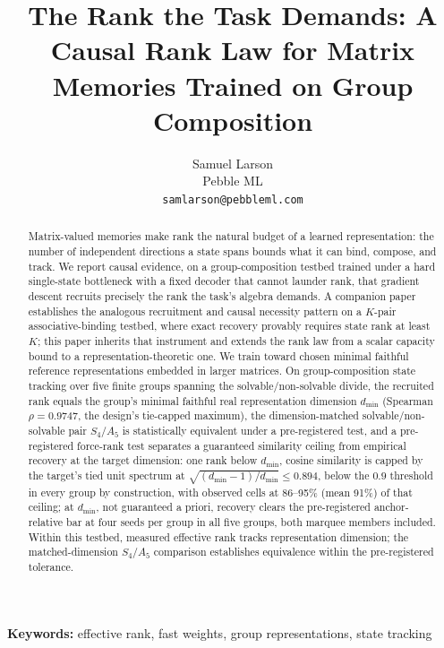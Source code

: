 \documentclass{article}
\title{The Rank the Task Demands:
A Causal Rank Law for Matrix Memories Trained on Group Composition}
\author{%
  Samuel Larson\\
  Pebble ML\\
  \texttt{samlarson@pebbleml.com}%
}
\theoremstyle{plain}
\newcommand{\dmin}{d_{\min}}
\begin{document}
\maketitle

\begin{abstract}
Matrix-valued memories make rank the natural budget of a learned
representation: the number of independent directions a state spans bounds
what it can bind, compose, and track. We report causal evidence, on a
group-composition testbed trained under a hard single-state bottleneck
with a fixed decoder that cannot launder rank, that gradient descent
recruits precisely the rank the task's algebra demands. A companion
paper \citep{larson2026companion} establishes the analogous recruitment
and causal necessity pattern on a $K$-pair associative-binding testbed,
where exact recovery provably requires state rank at least $K$; this
paper inherits that instrument and extends the rank law from a scalar
capacity bound to a representation-theoretic one.
We train toward chosen minimal faithful reference representations
embedded in larger matrices.
On
group-composition state tracking over five finite groups spanning the
solvable/non-solvable divide, the recruited rank equals the group's minimal
faithful real representation dimension $\dmin$ (Spearman $\rho = 0.9747$,
the design's tie-capped maximum),
the dimension-matched solvable/non-solvable
pair $S_4$/$A_5$ is statistically equivalent under a pre-registered
test,
and a pre-registered force-rank test separates a guaranteed similarity
ceiling from empirical recovery at the target dimension: one rank below
$\dmin$, cosine similarity is capped by the target's
tied unit spectrum at $\sqrt{(\dmin{-}1)/\dmin} \le 0.894$, below the
$0.9$ threshold in every group by construction, with observed cells
at 86--95\% (mean 91\%) of that ceiling;
at $\dmin$, not
guaranteed a priori, recovery clears the pre-registered
anchor-relative bar at four seeds per group in all five groups, both
marquee members included.
Within this testbed, measured effective rank tracks representation
dimension; the matched-dimension $S_4$/$A_5$ comparison establishes
equivalence within the pre-registered tolerance.
\end{abstract}

\noindent\textbf{Keywords:} effective rank, fast weights, group
representations, state tracking














\end{document}
